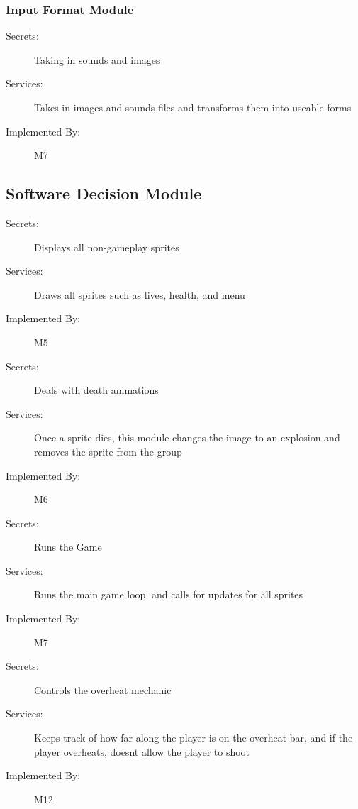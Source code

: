 \documentclass[12pt, titlepage]{article}
\begin{document}
\subsubsection{Input Format Module}

\begin{description}
\item[Secrets:] Taking in sounds and images 
\item[Services:]Takes in images and sounds files and transforms them into useable forms 
\item[Implemented By:] M7
\end{description}



\subsection{Software Decision Module}

\begin{description}
\item[Secrets:] Displays all non-gameplay sprites
\item[Services:] Draws all sprites such as lives, health, and menu

\item[Implemented By:] M5
\end{description}

\begin{description}
	\item[Secrets:] Deals with death animations
	\item[Services:] Once a sprite dies, this module changes the image to an explosion and removes the sprite from the group
	
	\item[Implemented By:] M6
\end{description}

\begin{description}
	\item[Secrets:] Runs the Game
	\item[Services:] Runs the main game loop, and calls for updates for all sprites 
	\item[Implemented By:] M7
\end{description}

\begin{description}
	\item[Secrets:] Controls the overheat mechanic
	\item[Services:] Keeps track of how far along the player is on the overheat bar, and if the player overheats, doesnt allow the player to shoot 
	\item[Implemented By:] M12
\end{description}
\end{document}
